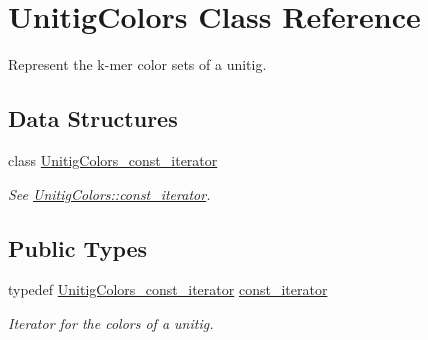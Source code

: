 \hypertarget{classUnitigColors}{}\section{Unitig\+Colors Class Reference}
\label{classUnitigColors}


Represent the k-\/mer color sets of a unitig.  


\subsection*{Data Structures}
\begin{DoxyCompactItemize}
\item 
class \hyperlink{classUnitigColors_1_1UnitigColors__const__iterator}{Unitig\+Colors\+\_\+const\+\_\+iterator}
\begin{DoxyCompactList}\small\item\em See \hyperlink{classUnitigColors_ad4d35f8af18dfd9cad99e92ca2328fee}{Unitig\+Colors\+::const\+\_\+iterator}. \end{DoxyCompactList}\end{DoxyCompactItemize}
\subsection*{Public Types}
\begin{DoxyCompactItemize}
\item 
typedef \hyperlink{classUnitigColors_1_1UnitigColors__const__iterator}{Unitig\+Colors\+\_\+const\+\_\+iterator} \hyperlink{classUnitigColors_ad4d35f8af18dfd9cad99e92ca2328fee}{const\+\_\+iterator}
\begin{DoxyCompactList}\small\item\em Iterator for the colors of a unitig. \end{DoxyCompactList}\end{DoxyCompactItemize}
